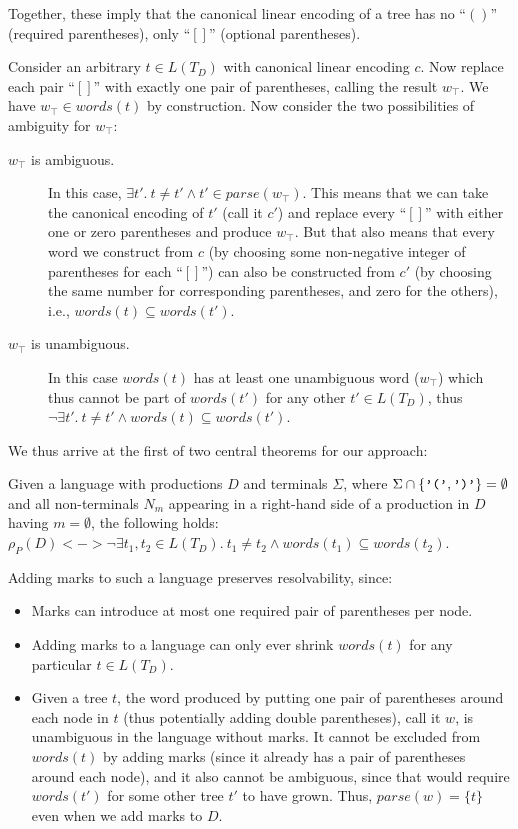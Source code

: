 \documentclass[runningheads]{llncs}
\newcommand{\T}{\Sigma} %
\newcommand{\parse}{\mathit{parse}} %
\newcommand{\words}{\mathit{words}} %
\newcommand{\reqpl}{(}
\newcommand{\reqpr}{)}
\newcommand{\reqp}[1]{\reqpl#1\reqpr}
\newcommand{\pospl}{[}
\newcommand{\pospr}{]}
\newcommand{\posp}[1]{\pospl#1\pospr}
\begin{document}
\noindent Together, these imply that the canonical linear encoding of a tree has no ``$\reqp{}$'' (required parentheses), only ``$\posp{}$'' (optional parentheses).

Consider an arbitrary $t \in L(T_D)$ with canonical linear encoding $c$. Now replace each pair ``$\posp{}$'' with exactly one pair of parentheses, calling the result $w_\top$. We have $w_\top \in \words(t)$ by construction. Now consider the two possibilities of ambiguity for $w_\top$:

\begin{description}
  \item[$w_\top$ is ambiguous.] In this case, $\exists t'.\ t \neq t' \land t' \in \parse(w_\top)$. This means that we can take the canonical encoding of $t'$ (call it $c'$) and replace every ``$[]$'' with either one or zero parentheses and produce $w_\top$. But that also means that every word we construct from $c$ (by choosing some non-negative integer of parentheses for each ``$[]$'') can also be constructed from $c'$ (by choosing the same number for corresponding parentheses, and zero for the others), i.e., $\words(t) \subseteq \words(t')$.
  \item[$w_\top$ is unambiguous.] In this case $\words(t)$ has at least one unambiguous word ($w_\top$) which thus cannot be part of $\words(t')$ for any other $t' \in L(T_D)$, thus $\neg \exists t'.\ t \neq t' \land \words(t) \subseteq \words(t')$.
\end{description}

\noindent We thus arrive at the first of two central theorems for our approach:

\begin{theorem}
  Given a language with productions $D$ and terminals $\T$, where $\T \cap \{\verb|'('|, \verb|')'|\} = \emptyset$ and all non-terminals $N_m$ appearing in a right-hand side of a production in $D$ having $m = \emptyset$, the following holds: $\rho_P(D) <-> \neg \exists t_1, t_2 \in L(T_D).\ t_1 \neq t_2 \land \words(t_1) \subseteq \words(t_2)$.
\end{theorem}

Adding marks to such a language preserves resolvability, since:

\begin{itemize}
  \item Marks can introduce at most one required pair of parentheses per node.
  \item Adding marks to a language can only ever shrink $\words(t)$ for any particular $t \in L(T_D)$.
  \item Given a tree $t$, the word produced by putting one pair of parentheses around each node in $t$ (thus potentially adding double parentheses), call it $w$, is unambiguous in the language without marks. It cannot be excluded from $\words(t)$ by adding marks (since it already has a pair of parentheses around each node), and it also cannot be ambiguous, since that would require $\words(t')$ for some other tree $t'$ to have grown. Thus, $\parse(w) = \{t\}$ even when we add marks to $D$.
\end{itemize}
\end{document}
